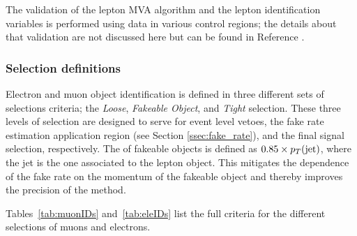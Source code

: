The validation of the lepton MVA algorithm and the lepton identification variables is performed using data in various control regions; the details about that validation are not discussed here but can be found in Reference \cite{CMS_AN_2017-029}. 

\subsubsection*{Selection definitions}

Electron and muon object identification is defined in three different sets of selections criteria; the \emph{Loose}, \emph{Fakeable Object}, and \emph{Tight} selection. These three levels of selection are designed to serve for event level vetoes, the fake rate estimation application region (see Section \ref{ssec:fake_rate}), and the final signal selection, respectively. The \pt of fakeable objects is defined as $0.85\times p_T(\mathrm{jet})$, where the jet is the one associated to the lepton object. This mitigates the dependence of the fake rate on the momentum of the fakeable object and thereby improves the precision of the method. 

Tables~\ref{tab:muonIDs} and~\ref{tab:eleIDs} list the full criteria for the different selections of muons and electrons.


